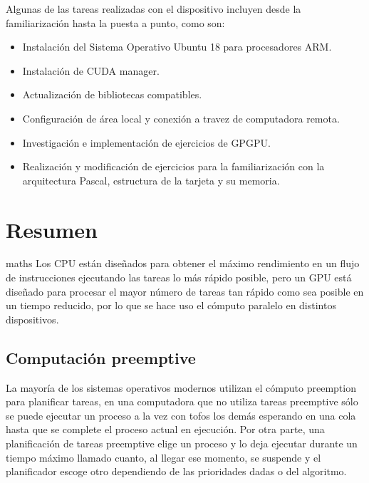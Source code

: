    Algunas de las tareas realizadas con el dispositivo incluyen desde la familiarización hasta la puesta a punto, como son:
   \begin{itemize}
    \item Instalación del Sistema Operativo Ubuntu 18 para procesadores ARM.
     \item Instalación de CUDA manager.
     \item Actualización de bibliotecas compatibles.
     \item Configuración de área local y conexión a travez de computadora remota.
      \item Investigación e implementación de ejercicios de GPGPU.
       \item Realización y modificación de ejercicios para la familiarización con la arquitectura Pascal, estructura de la tarjeta y su memoria.
    \end{itemize}   
   
    \section{Resumen}
\gls{maths}
Los CPU están diseñados para obtener el máximo rendimiento en un flujo de instrucciones ejecutando las tareas lo más rápido posible, pero un GPU está diseñado para procesar el mayor número de tareas tan rápido como sea posible en un tiempo reducido, por lo que se hace uso el cómputo paralelo en distintos dispositivos.

\subsection{Computación preemptive}
	La mayoría de los sistemas operativos modernos utilizan el cómputo preemption para planificar tareas, en una computadora que no utiliza tareas preemptive sólo se puede ejecutar un proceso a la vez con tofos los demás esperando en una cola hasta que se complete el proceso actual en ejecución. Por otra parte, una planificación de tareas preemptive elige un proceso y lo deja ejecutar durante un tiempo máximo llamado cuanto\cite{PreeK}, al llegar ese momento, se suspende y el planificador escoge otro dependiendo de las prioridades dadas o del algoritmo.



